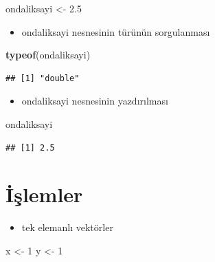 \documentclass[
  oneside]{book}
\newenvironment{Shaded}{\begin{snugshade}}{\end{snugshade}}
\newcommand{\DecValTok}[1]{\textcolor[rgb]{0.00,0.00,0.81}{#1}}
\newcommand{\FloatTok}[1]{\textcolor[rgb]{0.00,0.00,0.81}{#1}}
\newcommand{\FunctionTok}[1]{\textcolor[rgb]{0.13,0.29,0.53}{\textbf{#1}}}
\newcommand{\NormalTok}[1]{#1}
\newcommand{\OtherTok}[1]{\textcolor[rgb]{0.56,0.35,0.01}{#1}}
\providecommand{\tightlist}{%
  \setlength{\itemsep}{0pt}\setlength{\parskip}{0pt}}
\begin{document}
\begin{Shaded}
\begin{Highlighting}[]
\NormalTok{ondaliksayi }\OtherTok{\textless{}{-}} \FloatTok{2.5}
\end{Highlighting}
\end{Shaded}

\begin{itemize}
\tightlist
\item
  ondaliksayi nesnesinin türünün sorgulanması
\end{itemize}

\begin{Shaded}
\begin{Highlighting}[]
\FunctionTok{typeof}\NormalTok{(ondaliksayi)}
\end{Highlighting}
\end{Shaded}

\begin{verbatim}
## [1] "double"
\end{verbatim}

\begin{itemize}
\tightlist
\item
  ondaliksayi nesnesinin yazdırılması
\end{itemize}

\begin{Shaded}
\begin{Highlighting}[]
\NormalTok{ondaliksayi}
\end{Highlighting}
\end{Shaded}

\begin{verbatim}
## [1] 2.5
\end{verbatim}

\hypertarget{iux15flemler-1}{%
\section{İşlemler}\label{iux15flemler-1}}

\begin{itemize}
\tightlist
\item
  tek elemanlı vektörler
\end{itemize}

\begin{Shaded}
\begin{Highlighting}[]
\NormalTok{x }\OtherTok{\textless{}{-}} \DecValTok{1}
\NormalTok{y }\OtherTok{\textless{}{-}} \DecValTok{1}
\end{Highlighting}
\end{Shaded}
\end{document}
